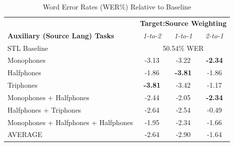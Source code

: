 \documentclass[a4paper]{article}
\begin{document}
\begin{table}[!htbp]
  \centering
  \caption{Word Error Rates (WER\%) Relative to Baseline}
    \label{tab:results}
  \begin{adjustbox}{width=.45\textwidth}
    \begin{tabular}{lccc}
      \toprule
      & \multicolumn{3}{c}{\textbf{Target:Source Weighting}} \\
      \textbf{Auxiliary (Source Lang) Tasks} & \textit{1-to-2} & \textit{1-to-1} & \textit{2-to-1}\\
      \midrule
      STL Baseline                          &  \multicolumn{3}{c}{50.54\% WER}  \\
      Monophones                            &  -3.13  & -3.22 & \textbf{-2.34}  \\
      Halfphones                            &  -1.86  & \textbf{-3.81} & -1.86 \\
      Triphones                             &  \textbf{-3.81} & -3.42 & -1.17  \\
      Monophones + Halfphones               &  -2.44  & -2.05 &  \textbf{-2.34}\\
      Halfphones + Triphones                &  -2.64  & -2.54 & -0.49 \\
      Monophones + Halfphones + Halfphones  &  -1.95  & -2.34 &  -1.66\\
      \midrule
      AVERAGE                               &  -2.64  & -2.90 & -1.64 \\
      \bottomrule
    \end{tabular}
  \end{adjustbox}
\end{table}
\end{document}
